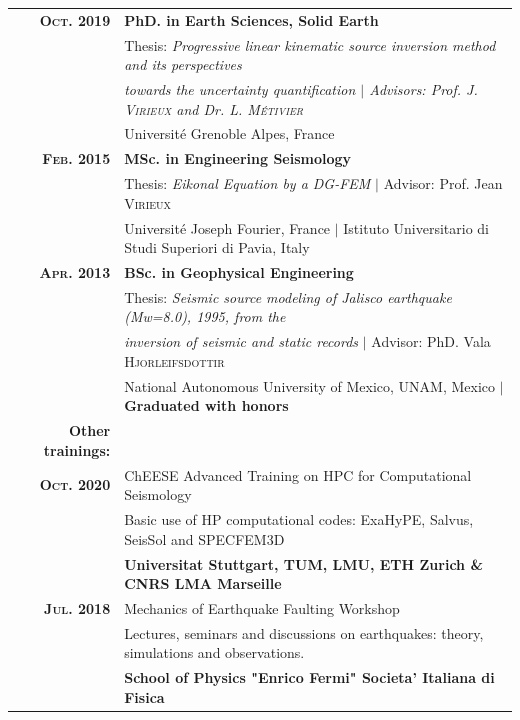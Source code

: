 \documentclass[a4paper]{article} %
\begin{document}
\begin{tabular}{rl}	
{\bf \textsc{Oct.} 2019} & {\bf PhD. in Earth Sciences, Solid Earth} \\
& Thesis: \emph{Progressive linear kinematic source inversion method and its perspectives} \\
& \emph{towards the uncertainty quantification $|$ \small Advisors: Prof. J. \textsc{Virieux} and Dr. L. \textsc{M\'etivier}}\\
& \small{Universit\'e Grenoble Alpes, France}\\[0.6em]


{\bf \textsc{Feb.} 2015} & {\bf MSc. in Engineering Seismology} \\
& Thesis: \emph{Eikonal Equation by a DG-FEM} $|$ \small Advisor: Prof. Jean \textsc{Virieux}\\
& \small{Universit\'e Joseph Fourier, France $|$ Istituto Universitario di Studi Superiori di Pavia, Italy}\\[0.6em]

{\bf \textsc{Apr.} 2013} & {\bf BSc. in Geophysical Engineering} \\
& Thesis: \emph{Seismic source modeling of Jalisco earthquake (Mw=8.0), 1995, from the} \\
& \emph{inversion of seismic and static records} $|$ \small Advisor: PhD. Vala \textsc{Hjorleifsdottir}\\
& \small{National Autonomous University of Mexico, UNAM, Mexico} $|$ \bf{Graduated with honors} \\[0.8em]

{\bf Other trainings:}\\[0.6em]
{\bf \textsc{Oct.} 2020} & ChEESE Advanced Training on HPC for Computational Seismology \\
& Basic use of HP computational codes: ExaHyPE, Salvus, SeisSol and SPECFEM3D \\
& \small\textbf{Universitat Stuttgart, TUM, LMU, ETH Zurich \& CNRS LMA Marseille}\\[0.6em]

{\bf \textsc{Jul.} 2018} & Mechanics of Earthquake Faulting Workshop \\
& Lectures, seminars and discussions on earthquakes: theory, simulations and observations. \\
& \small\textbf{School of Physics "Enrico Fermi" Societa' Italiana di Fisica}\\[0.6em]
\end{tabular}
\end{document}
